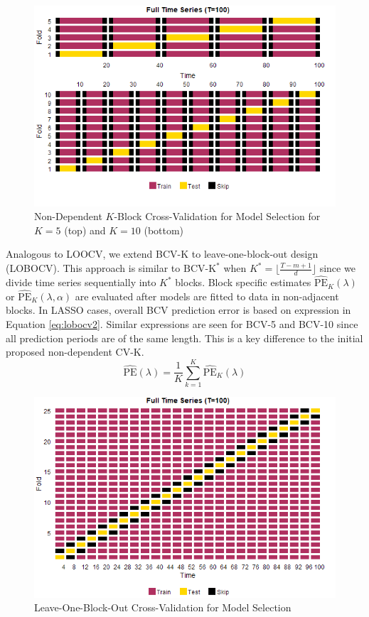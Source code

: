 \begin{figure}[htbp!]
	\caption{Non-Dependent $K$-Block Cross-Validation for Model Selection for $K=5$ (top) and $K=10$ (bottom)}
	\center
	\label{fig:bcvplots}
	\includegraphics[scale=0.58]{bcvplots}
\end{figure}

Analogous to LOOCV, we extend BCV-K to leave-one-block-out design (LOBOCV). This approach is similar to $\textrm{BCV-K}^*$ when $K^*=\lfloor \frac{T-m+1}{d} \rfloor$ since we divide time series sequentially into $K^*$ blocks. Block specific estimates $\widehat{\textrm{PE}}_K(\lambda)$ or $\widehat{\textrm{PE}}_K(\lambda,\alpha)$ are evaluated after models are fitted to data in non-adjacent blocks. In LASSO cases, overall BCV prediction error is based on expression in Equation \ref{eq:lobocv2}. Similar expressions are seen for BCV-5 and BCV-10 since all prediction periods are of the same length. This is a key difference to the initial proposed non-dependent CV-K.
\begin{equation}
\label{eq:lobocv2}
	\widehat{\textrm{PE}}(\lambda)=\frac{1}{K}\sum\limits_{k=1}^K \widehat{\textrm{PE}}_K(\lambda)
\end{equation}

\begin{figure}[htbp!]
	\caption{Leave-One-Block-Out Cross-Validation for Model Selection}
	\center
	\label{fig:lobocvplots}
	\includegraphics[scale=0.58]{lobocvplots}
\end{figure}

